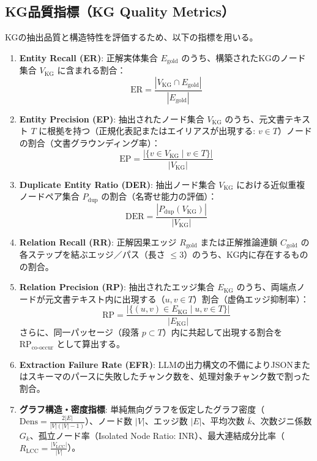 \documentclass[a4j,dvipdfmx]{jsarticle}
\begin{document}
\subsection{KG品質指標（KG Quality Metrics）}
KGの抽出品質と構造特性を評価するため、以下の指標を用いる。
\begin{enumerate}
    \item \textbf{Entity Recall (ER)}: 正解実体集合 $E_{\text{gold}}$ のうち、構築されたKGのノード集合 $V_{\text{KG}}$ に含まれる割合：
    \begin{equation}
        \text{ER} = \frac{|V_{\text{KG}} \cap E_{\text{gold}}|}{|E_{\text{gold}}|}
    \end{equation}
    \item \textbf{Entity Precision (EP)}: 抽出されたノード集合 $V_{\text{KG}}$ のうち、元文書テキスト $T$ に根拠を持つ（正規化表記またはエイリアスが出現する: $v \in T$）ノードの割合（文書グラウンディング率）：
    \begin{equation}
        \text{EP} = \frac{|\{v \in V_{\text{KG}} \mid v \in T\}|}{|V_{\text{KG}}|}
    \end{equation}
    \item \textbf{Duplicate Entity Ratio (DER)}: 抽出ノード集合 $V_{\text{KG}}$ における近似重複ノードペア集合 $P_{\text{dup}}$ の割合（名寄せ能力の評価）：
    \begin{equation}
        \text{DER} = \frac{|P_{\text{dup}}(V_{\text{KG}})|}{|V_{\text{KG}}|}
    \end{equation}
    \item \textbf{Relation Recall (RR)}: 正解因果エッジ $R_{\text{gold}}$ または正解推論連鎖 $C_{\text{gold}}$ の各ステップを結ぶエッジ／パス（長さ $\le 3$）のうち、KG内に存在するものの割合。
    \item \textbf{Relation Precision (RP)}: 抽出されたエッジ集合 $E_{\text{KG}}$ のうち、両端点ノードが元文書テキスト内に出現する（$u, v \in T$）割合（虚偽エッジ抑制率）：
    \begin{equation}
        \text{RP} = \frac{|\{(u, v) \in E_{\text{KG}} \mid u, v \in T\}|}{|E_{\text{KG}}|}
    \end{equation}
    さらに、同一パッセージ（段落 $p \subset T$）内に共起して出現する割合を $\text{RP}_{\text{co-occur}}$ として算出する。
    \item \textbf{Extraction Failure Rate (EFR)}: LLMの出力構文の不備によりJSONまたはスキーマのパースに失敗したチャンク数を、処理対象チャンク数で割った割合。
    \item \textbf{グラフ構造・密度指標}: 単純無向グラフを仮定したグラフ密度（$\text{Dens} = \frac{2|E|}{|V|(|V|-1)}$）、ノード数 $|V|$、エッジ数 $|E|$、平均次数 $\bar{k}$、次数ジニ係数 $G_k$、孤立ノード率（Isolated Node Ratio: INR）、最大連結成分比率（$R_{\text{LCC}} = \frac{|V_{\text{LCC}}|}{|V|}$）。
\end{enumerate}
\end{document}
